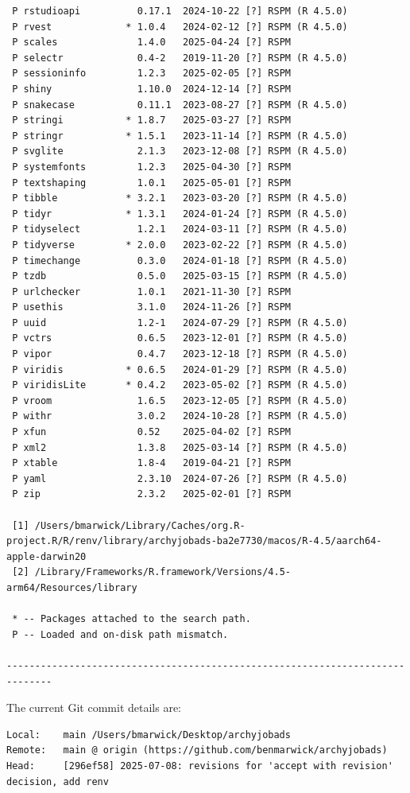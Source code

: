 \documentclass[
  12pt,
]{article}
\begin{document}
\begin{verbatim}
 P rstudioapi          0.17.1  2024-10-22 [?] RSPM (R 4.5.0)
 P rvest             * 1.0.4   2024-02-12 [?] RSPM (R 4.5.0)
 P scales              1.4.0   2025-04-24 [?] RSPM
 P selectr             0.4-2   2019-11-20 [?] RSPM (R 4.5.0)
 P sessioninfo         1.2.3   2025-02-05 [?] RSPM
 P shiny               1.10.0  2024-12-14 [?] RSPM
 P snakecase           0.11.1  2023-08-27 [?] RSPM (R 4.5.0)
 P stringi           * 1.8.7   2025-03-27 [?] RSPM
 P stringr           * 1.5.1   2023-11-14 [?] RSPM (R 4.5.0)
 P svglite             2.1.3   2023-12-08 [?] RSPM (R 4.5.0)
 P systemfonts         1.2.3   2025-04-30 [?] RSPM
 P textshaping         1.0.1   2025-05-01 [?] RSPM
 P tibble            * 3.2.1   2023-03-20 [?] RSPM (R 4.5.0)
 P tidyr             * 1.3.1   2024-01-24 [?] RSPM (R 4.5.0)
 P tidyselect          1.2.1   2024-03-11 [?] RSPM (R 4.5.0)
 P tidyverse         * 2.0.0   2023-02-22 [?] RSPM (R 4.5.0)
 P timechange          0.3.0   2024-01-18 [?] RSPM (R 4.5.0)
 P tzdb                0.5.0   2025-03-15 [?] RSPM (R 4.5.0)
 P urlchecker          1.0.1   2021-11-30 [?] RSPM
 P usethis             3.1.0   2024-11-26 [?] RSPM
 P uuid                1.2-1   2024-07-29 [?] RSPM (R 4.5.0)
 P vctrs               0.6.5   2023-12-01 [?] RSPM (R 4.5.0)
 P vipor               0.4.7   2023-12-18 [?] RSPM (R 4.5.0)
 P viridis           * 0.6.5   2024-01-29 [?] RSPM (R 4.5.0)
 P viridisLite       * 0.4.2   2023-05-02 [?] RSPM (R 4.5.0)
 P vroom               1.6.5   2023-12-05 [?] RSPM (R 4.5.0)
 P withr               3.0.2   2024-10-28 [?] RSPM (R 4.5.0)
 P xfun                0.52    2025-04-02 [?] RSPM
 P xml2                1.3.8   2025-03-14 [?] RSPM (R 4.5.0)
 P xtable              1.8-4   2019-04-21 [?] RSPM
 P yaml                2.3.10  2024-07-26 [?] RSPM (R 4.5.0)
 P zip                 2.3.2   2025-02-01 [?] RSPM

 [1] /Users/bmarwick/Library/Caches/org.R-project.R/R/renv/library/archyjobads-ba2e7730/macos/R-4.5/aarch64-apple-darwin20
 [2] /Library/Frameworks/R.framework/Versions/4.5-arm64/Resources/library

 * -- Packages attached to the search path.
 P -- Loaded and on-disk path mismatch.

------------------------------------------------------------------------------
\end{verbatim}

The current Git commit details are:

\begin{verbatim}
Local:    main /Users/bmarwick/Desktop/archyjobads
Remote:   main @ origin (https://github.com/benmarwick/archyjobads)
Head:     [296ef58] 2025-07-08: revisions for 'accept with revision' decision, add renv
\end{verbatim}
\end{document}
